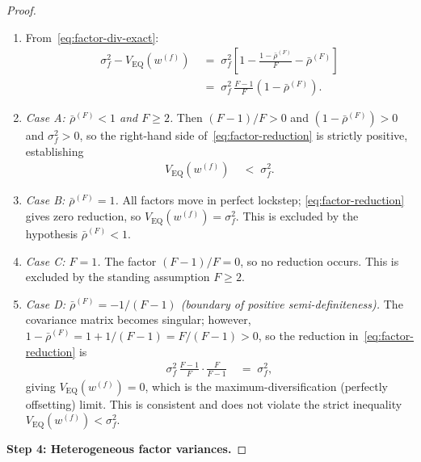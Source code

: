 \documentclass[12pt,openany]{book}
\newcommand{\bfw}{\mathbf{w}}
\numberwithin{equation}{chapter}
\theoremstyle{plain}
\theoremstyle{definition}
\theoremstyle{remark}
\def\bfw{w}%
\begin{document}
\begin{proof}
\begin{enumerate}
  \item From~\eqref{eq:factor-div-exact}:
        \begin{align}
          \sigma_f^2 - V_{\mathrm{EQ}}(\bfw^{(f)})
          &\;=\; \sigma_f^2\!\left[1
                   - \frac{1-\bar{\rho}^{(F)}}{F}
                   - \bar{\rho}^{(F)}\right]
          \nonumber\\
          &\;=\; \sigma_f^2\,\frac{F-1}{F}
                 \left(1 - \bar{\rho}^{(F)}\right).
          \label{eq:factor-reduction}
        \end{align}
  \item \textit{Case A: $\bar{\rho}^{(F)} < 1$ and $F \geq 2$.}
        Then $(F-1)/F > 0$ and $(1 - \bar{\rho}^{(F)}) > 0$ and
        $\sigma_f^2 > 0$, so the right-hand side
        of~\eqref{eq:factor-reduction} is strictly positive,
        establishing
        \begin{align}
          V_{\mathrm{EQ}}(\bfw^{(f)}) &\;<\; \sigma_f^2.
        \end{align}
  \item \textit{Case B: $\bar{\rho}^{(F)} = 1$.}
        All factors move in perfect lockstep;
        \eqref{eq:factor-reduction} gives zero reduction, so
        $V_{\mathrm{EQ}}(\bfw^{(f)}) = \sigma_f^2$.  This is
        excluded by the hypothesis $\bar{\rho}^{(F)} < 1$.
  \item \textit{Case C: $F = 1$.}
        The factor $(F-1)/F = 0$, so no reduction occurs.  This is
        excluded by the standing assumption $F \geq 2$.
  \item \textit{Case D: $\bar{\rho}^{(F)} = -1/(F-1)$ (boundary
        of positive semi-definiteness).}
        The covariance matrix becomes singular; however,
        $1 - \bar{\rho}^{(F)} = 1 + 1/(F-1) = F/(F-1) > 0$, so
        the reduction in~\eqref{eq:factor-reduction} is
        \begin{align}
          \sigma_f^2\,\frac{F-1}{F}\cdot\frac{F}{F-1}
          &\;=\; \sigma_f^2,
        \end{align}
        giving $V_{\mathrm{EQ}}(\bfw^{(f)}) = 0$, which is the
        maximum-diversification (perfectly offsetting) limit.
        This is consistent and does not violate the strict
        inequality $V_{\mathrm{EQ}}(\bfw^{(f)}) < \sigma_f^2$.
\end{enumerate}

\medskip
\noindent\textbf{Step 4: Heterogeneous factor variances.}


\end{proof}
\end{document}
